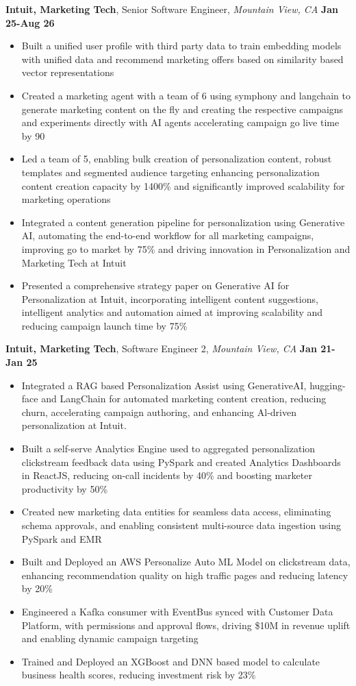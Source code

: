 \documentclass[10pt, letterpaper]{article}
\newcommand{\entry}[4]{
  \noindent\textbf{#1}, #2, \textit{#3} \hfill \textbf{#4}
}
\begin{document}
\entry{Intuit, Marketing Tech}{Senior Software Engineer}{Mountain View, CA}{Jan 25-Aug 26}
\begin{itemize}
	\item Built a unified user profile with third party data to train embedding models with unified data and recommend marketing offers based on similarity based vector representations
	\item Created a marketing agent with a team of 6 using symphony and langchain to generate marketing content on the fly and creating the respective campaigns and experiments directly with AI agents accelerating campaign go live time by 90%
	\item Led a team of 5, enabling bulk creation of personalization content, robust templates and segmented audience targeting enhancing personalization content creation capacity by 1400\% and significantly improved scalability for marketing operations
	\item Integrated a content generation pipeline for personalization using Generative AI, automating the end-to-end workflow for all marketing campaigns, improving go to market by 75\% and driving innovation in Personalization and Marketing Tech at Intuit
	\item Presented a comprehensive strategy paper on Generative AI for Personalization at Intuit, incorporating intelligent content suggestions, intelligent analytics and automation aimed at improving scalability and reducing campaign launch time by 75\%
\end{itemize}

\entry{Intuit, Marketing Tech}{Software Engineer 2}{Mountain View, CA}{Jan 21-Jan 25}
\begin{itemize}
	\item Integrated a RAG based Personalization Assist using GenerativeAI, hugging-face and LangChain for automated marketing content creation, reducing churn, accelerating campaign authoring, and enhancing Al-driven personalization at Intuit.
	\item Built a self-serve Analytics Engine used to aggregated personalization clickstream feedback data using PySpark and created Analytics Dashboards in ReactJS, reducing on-call incidents by 40\% and boosting marketer productivity by 50\%
	\item Created new marketing data entities for seamless data access, eliminating schema approvals, and enabling consistent multi-source data ingestion using PySpark and EMR
	\item Built and Deployed an AWS Personalize Auto ML Model on clickstream data, enhancing recommendation quality on high traffic pages and reducing latency by 20\%
	\item Engineered a Kafka consumer with EventBus synced with Customer Data Platform, with permissions and approval flows, driving \$10M in revenue uplift and enabling dynamic campaign targeting
	\item Trained and Deployed an XGBoost and DNN based model to calculate business health scores, reducing investment risk by 23\%
\end{itemize}
\end{document}
